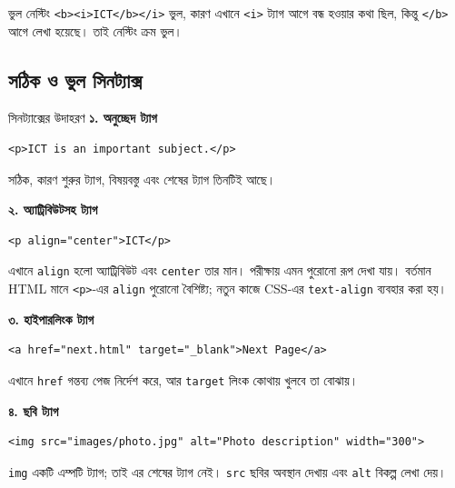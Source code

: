 \begin{mistakebox}{ভুল নেস্টিং}
\texttt{<b><i>ICT</b></i>} ভুল, কারণ এখানে \texttt{<i>} ট্যাগ আগে বন্ধ হওয়ার কথা ছিল, কিন্তু \texttt{</b>} আগে লেখা হয়েছে। তাই নেস্টিং ক্রম ভুল।
\end{mistakebox}





\subsection{সঠিক ও ভুল সিনট্যাক্স}
\begin{examplebox}{সিনট্যাক্সের উদাহরণ}
\textbf{১. অনুচ্ছেদ ট্যাগ}
\par\noindent\begin{minipage}{\linewidth}
\begin{verbatim}
<p>ICT is an important subject.</p>
\end{verbatim}
\end{minipage}\par
সঠিক, কারণ শুরুর ট্যাগ, বিষয়বস্তু এবং শেষের ট্যাগ তিনটিই আছে।

\vspace{3pt}
\textbf{২. অ্যাট্রিবিউটসহ ট্যাগ}
\par\noindent\begin{minipage}{\linewidth}
\begin{verbatim}
<p align="center">ICT</p>
\end{verbatim}
\end{minipage}\par
এখানে \texttt{align} হলো অ্যাট্রিবিউট এবং \texttt{center} তার মান। পরীক্ষায় এমন পুরোনো রূপ দেখা যায়। বর্তমান HTML মানে \texttt{<p>}-এর \texttt{align} পুরোনো বৈশিষ্ট্য; নতুন কাজে CSS-এর \texttt{text-align} ব্যবহার করা হয়।

\vspace{3pt}
\textbf{৩. হাইপারলিংক ট্যাগ}
\par\noindent\begin{minipage}{\linewidth}
\begin{verbatim}
<a href="next.html" target="_blank">Next Page</a>
\end{verbatim}
\end{minipage}\par
এখানে \texttt{href} গন্তব্য পেজ নির্দেশ করে, আর \texttt{target} লিংক কোথায় খুলবে তা বোঝায়।

\vspace{3pt}
\textbf{৪. ছবি ট্যাগ}
\par\noindent\begin{minipage}{\linewidth}
\begin{verbatim}
<img src="images/photo.jpg" alt="Photo description" width="300">
\end{verbatim}
\end{minipage}\par
\texttt{img} একটি এম্পটি ট্যাগ; তাই এর শেষের ট্যাগ নেই। \texttt{src} ছবির অবস্থান দেখায় এবং \texttt{alt} বিকল্প লেখা দেয়।


\end{examplebox}
